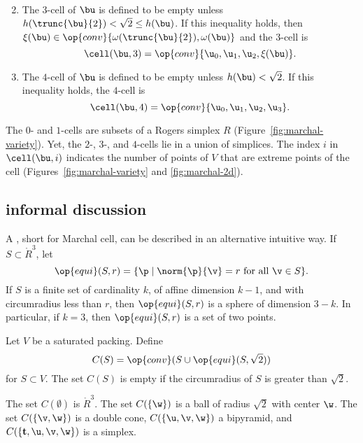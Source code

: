 \begin{definition}
\begin{enumerate}
\begin{align*}
\end{align*}
\bigskip
\item
The $3$-cell of $\bu$ is defined to be empty unless 
$h(\trunc{\bu}{2}) <\sqrt2 \le h(\bu)$.
If this inequality holds, then $\xi(\bu)\in \op{conv}
\{\omega(\trunc{\bu}{2}),\omega(\bu)\}$
and  the $3$-cell is
\[  
\cell(\bu,3) = \op{conv}\{ \u_0, \u_1, \u_2,\xi(\bu)\}.
\] 
\bigskip
\item
The $4$-cell of $\bu$ is defined to be empty unless
$h(\bu) <\sqrt2$.
If this inequality holds, the $4$-cell is
\[  
\cell(\bu,4) = \op{conv}\{ \u_0, \u_1, \u_2, \u_3\}.
\] 
\end{enumerate}
\end{definition}
%

\figKVIVUOT %

The $0$- and $1$-cells are subsets of a Rogers simplex $R$
(Figure~\ref{fig:marchal-variety}).  Yet, the $2$-, $3$-, and
$4$-cells lie in a union of simplices.  The index $i$ in
$\cell(\bu,i)$ indicates the number of points of $V$ that are extreme
points of the cell (Figures~\ref{fig:marchal-variety} and
\ref{fig:marchal-2d}).

\figBWEYURN %

\subsection{informal discussion}

A , short for Marchal cell,
can be described in an alternative intuitive way.
If $S\subset\ring{R}^3$, let
\[
\op{equi}(S,r) = \{ \p \mid \norm{\p}{\v} = r \text{ for all } \v \in S \}.
\]
If $S$ is a finite set of cardinality $k$, of affine dimension $k-1$, and
with circumradius less than $r$, then
$\op{equi}(S,r)$ is a sphere of dimension $3-k$.  In particular,
if $k=3$, then $\op{equi}(S,r)$ is a set of two points.
%
%

Let $V$ be a saturated packing.  Define
\[
C(S) = \op{conv} (S\cup\op{equi}(S, \sqrt2) )
\]
for $S\subset V$.  The set $C(S)$ is empty if the circumradius of $S$
is greater than $\sqrt2$.

The set $C(\emptyset)$ is $\ring{R}^3$.  The set $C(\{\w\})$ is a ball
of radius $\sqrt2$ with center $\w$.  The set $C(\{\v,\w\})$ is a
double cone, $C(\{\u,\v,\w\})$ a bipyramid, and $C(\{{\mathbf
  t},\u,\v,\w\})$ is a simplex.

